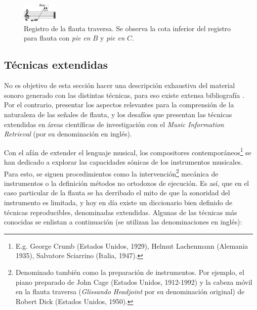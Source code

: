 \documentclass
  [ams,pdfout]%
	{aeslac}
\begin{document}
\begin{figure}[h!]
\begin{center}
\includegraphics[width=0.15\textwidth]{imagenes/registro_flauta} 
\caption{Registro de la flauta traversa. Se observa la cota inferior del registro para flauta con \textit{pie en $B$} y \textit{pie en $C$}.}
\label{fig:registro_flauta}
\end{center}
\end{figure} 

%
\subsection{Técnicas extendidas}

No es objetivo de esta sección hacer una descripción exhaustiva del material sonoro generado con las distintas técnicas, para eso existe extensa bibliografía \cite{samuel2002study,dick1975other}. Por el contrario, presentar los aspectos relevantes para la comprensión de la naturaleza de las señales de flauta, y los desafíos que presentan las técnicas extendidas en áreas científicas de investigación con el \textit{Music Information Retrieval} (por su denominación en inglés).   

%
Con el afán de extender el lenguaje musical, los compositores contemporáneos\footnote{E.g. George Crumb (Estados Unidos, 1929), Helmut Lachenmann (Alemania 1935), Salvatore Sciarrino (Italia, 1947).} se han dedicado a explorar las capacidades sónicas de los instrumentos musicales. Para esto, se siguen procedimientos como la intervención\footnote{Denominado también como la preparación de instrumentos. Por ejemplo, el piano preparado de John Cage (Estados Unidos, 1912-1992) y la cabeza móvil en la flauta traversa (\textit{Glissando Headjoint} por su denominación original) de Robert Dick (Estados Unidos, 1950).} mecánica de instrumentos o la definición métodos no ortodoxos de ejecución. Es así, que en el caso particular de la flauta se ha derribado el mito de que la sonoridad del instrumento es limitada, y hoy en día existe un diccionario bien definido de técnicas reproducibles, denominadas extendidas\cite{dick1975other}. Algunas de las técnicas más conocidas se enlistan a continuación (se utilizan las denominaciones en inglés):
\end{document}
